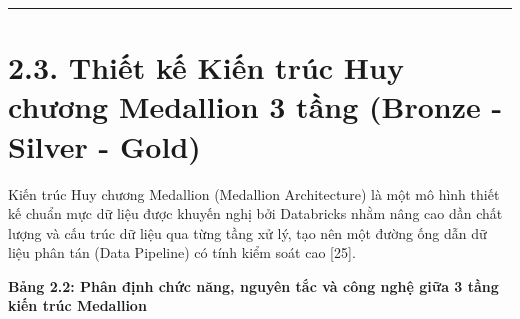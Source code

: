 \documentclass[
  13pt,
  a4paper,
]{report}
\begin{document}
\begin{center}\rule{0.5\linewidth}{0.5pt}\end{center}

\section{2.3. Thiết kế Kiến trúc Huy chương Medallion 3 tầng (Bronze -
Silver -
Gold)}\label{thiux1ebft-kux1ebf-kiux1ebfn-truxfac-huy-chux1b0ux1a1ng-medallion-3-tux1ea7ng-bronze---silver---gold}

Kiến trúc Huy chương Medallion (Medallion Architecture) là một mô hình
thiết kế chuẩn mực dữ liệu được khuyến nghị bởi Databricks nhằm nâng cao
dần chất lượng và cấu trúc dữ liệu qua từng tầng xử lý, tạo nên một
đường ống dẫn dữ liệu phân tán (Data Pipeline) có tính kiểm soát cao
{[}25{]}.

\textbf{Bảng 2.2: Phân định chức năng, nguyên tắc và công nghệ giữa 3
tầng kiến trúc Medallion}
\end{document}
